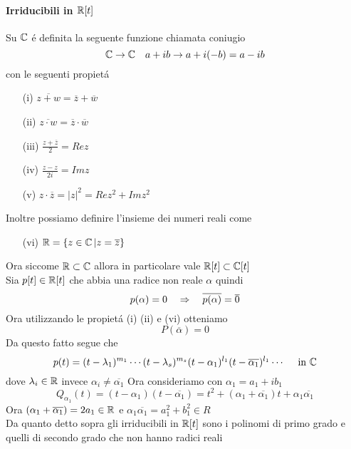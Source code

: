 \paragraph{Irriducibili in $\mathbb{R}[t]$}
Su $\mathbb{C}$ \'e definita la seguente funzione chiamata coniugio
$$ \mathbb{C} \to \mathbb{C} \quad a+ib \to a+i(-b) = a-ib $$
con le seguenti propiet\'a
\begin{itemize}
\item[(i)] $ \overline{z+w}=\overline{z}+ \overline{w}$
\item[(ii)]$ \overline{z\cdot w}=\overline{z} \cdot  \overline{w}$
\item[(iii)]  $\frac{ z +  \overline{z}}{2}=  Re z $
\item[(iv)] $ \frac{z - z }{2 i }=Im z $
\item[(v)] $ z \cdot \overline{z} = \vert z \vert ^2 =Re z ^2 + Im z ^2$
\end{itemize}
Inoltre possiamo definire l'insieme dei numeri reali come
\begin{itemize}
 \item[(vi)] $\mathbb{R}=\{ z \in \mathbb{C} \, \vert z = \overline{z } \} $

\end{itemize}

Ora siccome $\mathbb{R} \subset \mathbb{C} $ allora in particolare vale $\mathbb{R}[t] \subset \mathbb{C}[t]$\\
Sia $p[t] \in \mathbb{R}[t] $ che abbia una radice non reale $\alpha $ quindi
 $$p(\alpha)=0 \quad \Rightarrow \quad \overline{p(\alpha)}= \overline{0}$$ 
Ora utilizzando le propiet\'a (i) (ii) e (vi) otteniamo 
$$ P(\overline{\alpha})=0 $$
Da questo fatto segue che 
$$ p(t) = (t- \lambda_1)^{m_1} \cdots (t-\lambda_s)^{m_s} (t-\alpha_1)^{l_1} (t - \overline{\alpha_1})^{l_1} \cdots \quad \text{ in } \mathbb{C} $$
dove $\lambda_i \in \mathbb{R} $ 
invece $\alpha_i \neq \overline{\alpha_1}$
Ora consideriamo  con $\alpha_1 =a_1 + i b_1$
$$ Q_{\alpha_1}(t) = ( t- \alpha_1 ) (t- \overline{\alpha_1} ) = t^2 + ( \alpha_1+ \overline{ \alpha_1}) t  + \alpha_1 \overline{\alpha_1}$$
Ora $( \alpha_1+ \overline{ \alpha_1})  = 2 a_1  \in \mathbb{R} $ e $  \alpha_1 \overline{\alpha_1} = a_1^2 + b_1^2 \in R$\\ 
Da quanto detto sopra  gli irriducibili in $\mathbb{R}[t]$ sono i polinomi di primo grado e quelli di secondo grado che non hanno radici reali 
\newpage

